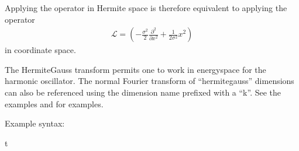 \documentclass[letterpaper,10pt,english]{sphinxmanual}
\begin{document}
\sphinxAtStartPar
Applying the operator  in Hermite space is therefore equivalent to applying the operator
\begin{equation*}
\begin{split}\mathcal{L} = \left(- \frac{\sigma^2}{2}\frac{\partial^2}{\partial x^2} + \frac{1}{2 \sigma^2} x^2 \right)\end{split}
\end{equation*}
\sphinxAtStartPar
in coordinate space.

\sphinxAtStartPar
The Hermite\sphinxhyphen{}Gauss transform permits one to work in energy\sphinxhyphen{}space for the harmonic oscillator.  The normal Fourier transform of “hermite\sphinxhyphen{}gauss” dimensions can also be referenced using the dimension name prefixed with a “k”.  See the examples  and  for examples.

\sphinxAtStartPar
Example syntax:

\begin{sphinxVerbatim}[commandchars=\\\{\}]
 
         t 
                 
\end{sphinxVerbatim}

\ignorespaces 
\end{document}
